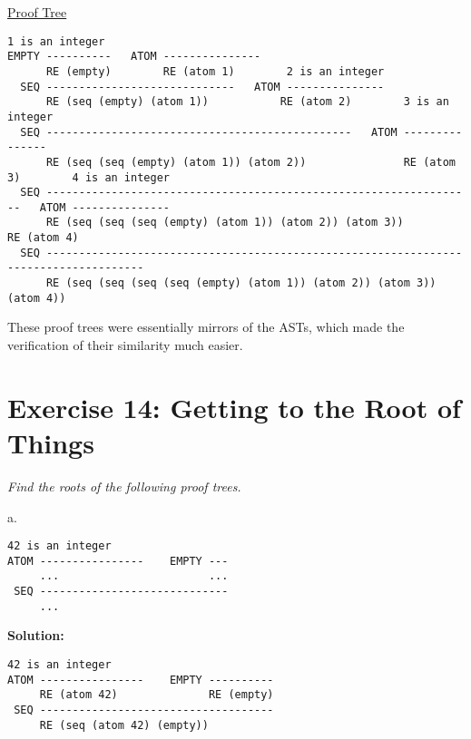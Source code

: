 \documentclass{article}
\begin{document}
\underline{Proof Tree}
\begin{lstlisting}[language=vasu]
                        1 is an integer                        
EMPTY ----------   ATOM ---------------                                                
      RE (empty)        RE (atom 1)        2 is an integer                                 
  SEQ -----------------------------   ATOM ---------------                                               
      RE (seq (empty) (atom 1))           RE (atom 2)        3 is an integer                                  
  SEQ -----------------------------------------------   ATOM ---------------                                     
      RE (seq (seq (empty) (atom 1)) (atom 2))               RE (atom 3)        4 is an integer                   
  SEQ ------------------------------------------------------------------   ATOM ---------------
      RE (seq (seq (seq (empty) (atom 1)) (atom 2)) (atom 3))                   RE (atom 4)                     
  SEQ -------------------------------------------------------------------------------------                   
      RE (seq (seq (seq (seq (empty) (atom 1)) (atom 2)) (atom 3)) (atom 4))                      
\end{lstlisting}


These proof trees were essentially mirrors of the ASTs, which made the verification of their similarity much easier.

\newpage

\section{Exercise 14: Getting to the Root of Things}

\textit{Find the roots of the following proof trees.}\linebreak \linebreak

a.
\begin{lstlisting}[language=vasu]
     42 is an integer
ATOM ----------------    EMPTY ---
     ...                       ...
 SEQ -----------------------------
     ...
\end{lstlisting}

\noindent \textbf{Solution:}
\begin{lstlisting}[language=vasu]
     42 is an integer
ATOM ----------------    EMPTY ----------
     RE (atom 42)              RE (empty)
 SEQ ------------------------------------
     RE (seq (atom 42) (empty))
\end{lstlisting}
\end{document}
